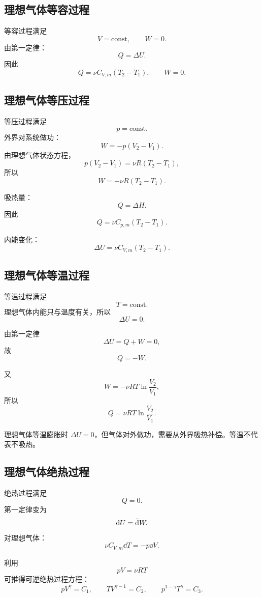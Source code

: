 \subsection{理想气体等容过程}

等容过程满足
\[
  V=\mathrm{const},
  \qquad
  W=0.
\]
由第一定律：
\[
  Q=\Delta U.
\]
因此
\[
  \boxed{
  Q=\nu C_{V,m}(T_2-T_1)
  },
  \qquad
  \boxed{
  W=0
  }.
\]

\subsection{理想气体等压过程}

等压过程满足
\[
  p=\mathrm{const}.
\]
外界对系统做功：
\[
  W=-p(V_2-V_1).
\]
由理想气体状态方程，
\[
  p(V_2-V_1)=\nu R(T_2-T_1),
\]
所以
\[
  \boxed{
  W=-\nu R(T_2-T_1)
  }.
\]

吸热量：
\[
  Q=\Delta H.
\]
因此
\[
  \boxed{
  Q=\nu C_{p,m}(T_2-T_1)
  }.
\]

内能变化：
\[
  \boxed{
  \Delta U=\nu C_{V,m}(T_2-T_1)
  }.
\]

\subsection{理想气体等温过程}

等温过程满足
\[
  T=\mathrm{const}.
\]
理想气体内能只与温度有关，所以
\[
  \boxed{\Delta U=0}.
\]

由第一定律
\[
  \Delta U=Q+W=0,
\]
故
\[
  \boxed{
  Q=-W
  }.
\]

又
\[
  W=-\nu RT\ln\frac{V_2}{V_1},
\]
所以
\[
  \boxed{
  Q=\nu RT\ln\frac{V_2}{V_1}
  }.
\]

\begin{WarnBox}[等温过程不是绝热过程]
理想气体等温膨胀时 \(\Delta U=0\)，但气体对外做功，需要从外界吸热补偿。等温不代表不吸热。
\end{WarnBox}

\subsection{理想气体绝热过程}

绝热过程满足
\[
  \boxed{Q=0}.
\]
第一定律变为
\[
  \mathop{}\!\mathrm{d} U=\mathop{}\!\bar{\mathrm{d}} W.
\]
对理想气体：
\[
  \nu C_{V,m}\dd T=-p\dd V.
\]

利用
\[
  pV=\nu RT
\]
可推得可逆绝热过程方程：
\[
  \boxed{
  pV^\gamma=C_1
  },
  \qquad
  \boxed{
  TV^{\gamma-1}=C_2
  },
  \qquad
  \boxed{
  p^{1-\gamma}T^\gamma=C_3
  }.
\]

